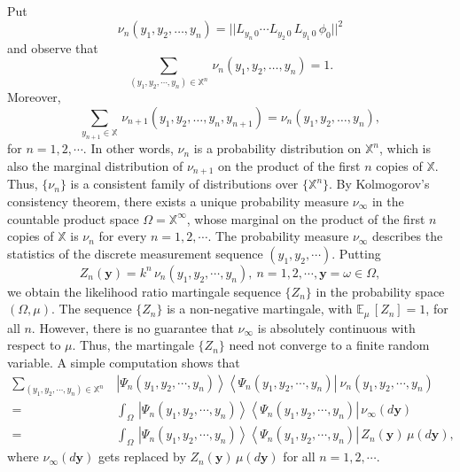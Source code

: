 Put 
$$
\nu_n(y_1,y_2,\ldots, y_n)=\vert\vert L_{y_{n}\, 0} \cdots L_{y_2\,0}\,L_{y_1\,0}\, \phi_0\vert\vert^2
$$
and observe that 
$$
\sum_{(y_1,y_2,\cdots , y_n)\in \mathbb{X}^n}\, \nu_n(y_1,y_2,\ldots, y_n)=1.
$$
Moreover, 
$$
\sum_{y_{n+1}\in \mathbb{X}}\, \nu_{n+1}(y_1,y_2,\ldots, y_n,y_{n+1})=\nu_n(y_1,y_2,\ldots, y_n),
$$
for $n=1,2,\cdots$. In other words, $\nu_n$ is a probability distribution on $\mathbb{X}^n$, which is also the marginal distribution of $\nu_{n+1}$ on the product of the first $n$ copies of $\mathbb{X}$.  Thus, $\{\nu_n\}$ is a consistent family of distributions over $\{\mathbb{X}^n\}$. By Kolmogorov's consistency theorem, there exists a unique probability measure $\nu_\infty$ in the countable product space 
$\Omega=\mathbb{X}^\infty$, whose  marginal on the product of the first $n$ copies of $\mathbb{X}$ is $\nu_n$ for every $n=1,2,\cdots$. The probability measure $\nu_\infty$ describes the statistics of the discrete measurement sequence $(y_1,y_2,\cdots )$.  Putting  
$$
Z_n(\mathbf{y})=k^n\, \nu_n(y_1,y_2,\cdots , y_n),\ n=1,2,\cdots, \mathbf{y}=\omega\in\Omega, 
$$
we obtain the likelihood ratio  martingale sequence $\{Z_n\}$ in the probability space $(\Omega, \mu)$. The sequence $\{Z_n\}$ is a non-negative martingale, with $\mathbb{E}_\mu\, [Z_n]=1$, for all $n$. However, there is no guarantee that $\nu_\infty$ is absolutely continuous with respect to $\mu$. Thus, the martingale $\{Z_n\}$ need not converge to a finite random variable.  A simple computation shows that 
\begin{align*}
	\sum_{(y_1,y_2,\cdots , y_n)\in \mathbb{X}^n}\, & \left\vert \Psi_n(y_1,y_2,\cdots , y_n)\right\rangle \left\langle 
	\Psi_n(y_1,y_2,\cdots , y_n)   \right\vert\ \nu_n(y_1,y_2,\cdots, y_n)  \\    
	=& \int_\Omega\, \left\vert \Psi_n(y_1,y_2,\cdots , y_n)\right\rangle \left\langle\Psi_n(y_1,y_2,\cdots , y_n)   
	\right\vert \, \nu_\infty(d\mathbf{y}) \\ 
	=& \int_\Omega\, \left\vert \Psi_n(y_1,y_2,\cdots , y_n)\right\rangle \left\langle\Psi_n(y_1,y_2,\cdots , y_n)\right\vert \, Z_n(\mathbf{y})\, \mu(d\mathbf{y}), 
\end{align*}
where  $\nu_\infty(d\mathbf{y})$ gets replaced by $Z_n(\mathbf{y})\, \mu(d \mathbf{y})$ for all $n=1,2,\cdots.$ 

